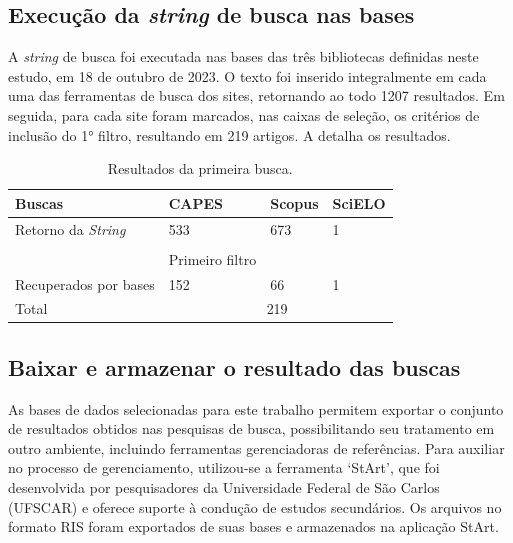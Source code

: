 \documentclass[portuguese]{textolivre}
\begin{document}
\subsection{Execução da \textit{string} de busca nas bases}\label{sec-autores}
A \textit{string} de busca foi executada nas bases das três bibliotecas definidas neste estudo, em 18 de outubro de 2023. O texto foi inserido integralmente em cada uma das ferramentas de busca dos sites, retornando ao todo 1207 resultados. Em seguida, para cada site foram marcados, nas caixas de seleção, os critérios de inclusão do 1° filtro, resultando em 219 artigos. A  detalha os resultados.

\begin{table}[htbp]
\centering
\begin{threeparttable}
\caption{Resultados da primeira busca.}
\label{tab02}
\begin{tabular}{l l l l}
\toprule
 Buscas & CAPES & Scopus & SciELO \\
 \midrule
Retorno da \textit{String} & 533 & 673 & 1 \\
\vspace{0.5em}\\
& Primeiro filtro \\
Recuperados por bases & 152 & 66 & 1 \\
Total & \multicolumn{3}{c}{219} \\
\bottomrule
\end{tabular}
\end{threeparttable}
\end{table}


\subsection{Baixar e armazenar o resultado das buscas}\label{sec-idioma}
As bases de dados selecionadas para este trabalho permitem exportar o conjunto de resultados obtidos nas pesquisas de busca, possibilitando seu tratamento em outro ambiente, incluindo ferramentas gerenciadoras de referências. Para auxiliar no processo de gerenciamento, utilizou-se a ferramenta ‘StArt’, que foi desenvolvida por pesquisadores da Universidade Federal de São Carlos (UFSCAR) e oferece suporte à condução de estudos secundários. Os arquivos no formato RIS foram exportados de suas bases e armazenados na aplicação StArt.
\end{document}
